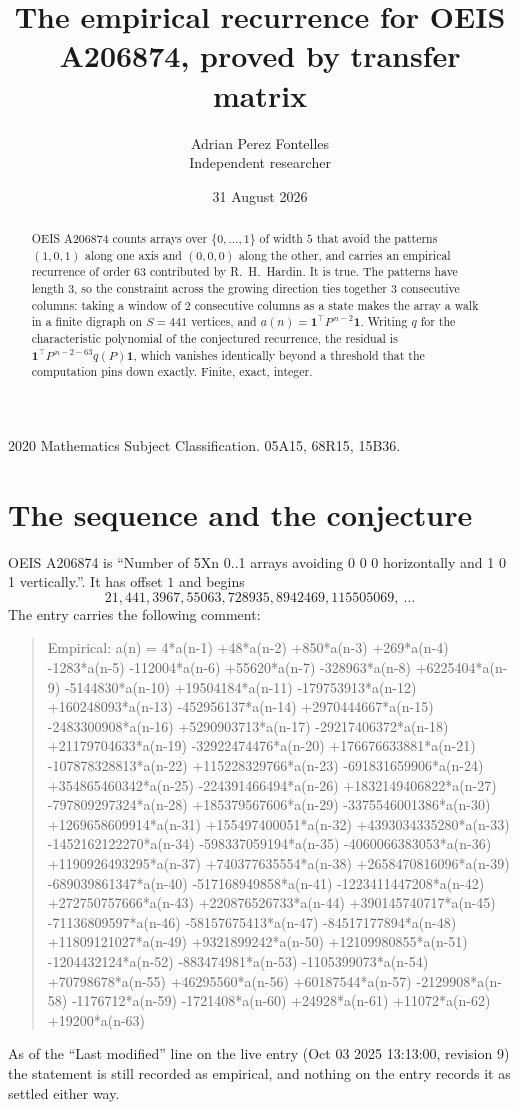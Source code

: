 \documentclass[11pt,a4paper]{article}
\title{The empirical recurrence for OEIS A206874, proved by transfer matrix}
\author{Adrian Perez Fontelles\\ \small Independent researcher}
\date{31 August 2026}
\theoremstyle{plain}
\theoremstyle{definition}
\begin{document}
\maketitle

\begin{abstract}
OEIS A206874 counts arrays over $\{0,\dots,1\}$ of width $5$ that avoid the patterns
$(1,0,1)$ along one axis and $(0,0,0)$ along the other, and carries an empirical recurrence of
order $63$ contributed by R.~H.~Hardin. It is true. The patterns have length $3$, so
the constraint across the growing direction ties together $3$ consecutive columns: taking a
window of $2$ consecutive columns as a state makes the array a walk in a finite digraph
on $S=441$ vertices, and $a(n)=\mathbf{1}^{\!\top}P^{\,n-2}\mathbf{1}$. Writing $q$
for the characteristic polynomial of the conjectured recurrence, the residual is
$\mathbf{1}^{\!\top}P^{\,n-2-63}q(P)\mathbf{1}$, which vanishes identically
beyond a threshold that the computation pins down exactly. Finite, exact, integer.
\end{abstract}

\noindent\small 2020 Mathematics Subject Classification. 05A15, 68R15, 15B36.\normalsize

\section{The sequence and the conjecture}

OEIS A206874 is ``Number of 5Xn 0..1 arrays avoiding 0 0 0 horizontally and 1 0 1 vertically.''. It has offset
$1$ and begins
\[
21, 441, 3967, 55063, 728935, 8942469, 115505069,\ \dots
\]
The entry carries the following comment:
\begin{quote}\small
Empirical: a(n) = 4*a(n-1) +48*a(n-2) +850*a(n-3) +269*a(n-4) -1283*a(n-5) -112004*a(n-6) +55620*a(n-7) -328963*a(n-8) +6225404*a(n-9) -5144830*a(n-10) +19504184*a(n-11) -179753913*a(n-12) +160248093*a(n-13) -452956137*a(n-14) +2970444667*a(n-15) -2483300908*a(n-16) +5290903713*a(n-17) -29217406372*a(n-18) +21179704633*a(n-19) -32922474476*a(n-20) +176676633881*a(n-21) -107878328813*a(n-22) +115228329766*a(n-23) -691831659906*a(n-24) +354865460342*a(n-25) -224391466494*a(n-26) +1832149406822*a(n-27) -797809297324*a(n-28) +185379567606*a(n-29) -3375546001386*a(n-30) +1269658609914*a(n-31) +155497400051*a(n-32) +4393034335280*a(n-33) -1452162122270*a(n-34) -598337059194*a(n-35) -4060066383053*a(n-36) +1190926493295*a(n-37) +740377635554*a(n-38) +2658470816096*a(n-39) -689039861347*a(n-40) -517168949858*a(n-41) -1223411447208*a(n-42) +272750757666*a(n-43) +220876526733*a(n-44) +390145740717*a(n-45) -71136809597*a(n-46) -58157675413*a(n-47) -84517177894*a(n-48) +11809121027*a(n-49) +9321899242*a(n-50) +12109980855*a(n-51) -1204432124*a(n-52) -883474981*a(n-53) -1105399073*a(n-54) +70798678*a(n-55) +46295560*a(n-56) +60187544*a(n-57) -2129908*a(n-58) -1176712*a(n-59) -1721408*a(n-60) +24928*a(n-61) +11072*a(n-62) +19200*a(n-63)
\end{quote}
As of the ``Last modified'' line on the live entry (Oct 03 2025 13:13:00, revision
9) the statement is still recorded as empirical, and nothing on the entry
records it as settled either way.
\end{document}
